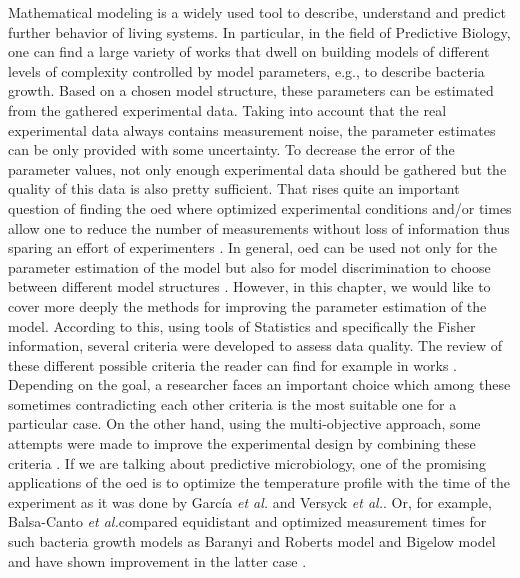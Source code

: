 \documentclass[10pt,A4paper]{article}
\newcommand{\etal}{{\textit{et al.}}}
\begin{document}
Mathematical modeling is a widely used tool to describe, understand and predict further behavior of living systems.
In particular, in the field of Predictive Biology, one can find a large variety of works that dwell on building models of different levels of complexity controlled by model parameters, e.g., to describe bacteria growth.
Based on a chosen model structure, these parameters can be estimated from the gathered experimental data.
Taking into account that the real experimental data always contains measurement noise, the parameter estimates can be only provided with some uncertainty. 
To decrease the error of the parameter values, not only enough experimental data should be gathered but the quality of this data is also pretty sufficient.
That rises quite an important question of finding the \ac{oed} where optimized experimental conditions and/or times allow one to reduce the number of measurements without loss of information thus sparing an effort of experimenters \cite{derlindenImpactExperimentDesign2013, balsa-cantoe.bangaj.r.COMPUTINGOPTIMALDYNAMIC2008}. 
In general, \ac{oed} can be used not only for the parameter estimation of the model but also for model discrimination to choose between different model structures \cite{kreutzSystemsBiology2009, stamatiOptimalExperimentalDesign2016}.
However, in this chapter, we would like to cover more deeply the methods for improving the parameter estimation of the model.
According to this, using tools of Statistics and specifically the Fisher information, several criteria were developed to assess data quality. 
The review of these different possible criteria the reader can find for example in works \cite{atkinsonDevelopmentsDesignExperiments1982, franceschiniModelbasedDesignExperiments2008}.
Depending on the goal, a researcher faces an important choice which among these sometimes contradicting each other criteria is the most suitable one for a particular case.
On the other hand, using the multi-objective approach, some attempts were made to improve the experimental design by combining these criteria \cite{telenOptimalExperimentDesign2012, logistRobustMultiobjectiveOptimal2011}.
If we are talking about predictive microbiology, one of the promising applications of the \ac{oed} is to optimize the temperature profile with the time of the experiment as it was done by García \etal \cite{garciaQualityShelflifePrediction2015} and Versyck \etal \cite{versyckIntroducingOptimal1999}.
Or, for example, Balsa-Canto \etal compared equidistant and optimized measurement times for such bacteria growth models as Baranyi and Roberts model and Bigelow model and have shown improvement in the latter case \cite{balsa-cantoe.bangaj.r.COMPUTINGOPTIMALDYNAMIC2008}.
\end{document}

